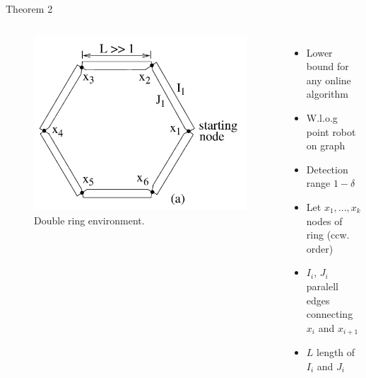 \documentclass{beamer}
\begin{document}
\begin{frame}{Theorem 2}
    \begin{columns}
        \begin{figure}
            \includegraphics[width=\linewidth]{Images/fig13a.png}
            \caption{Double ring environment.}
        \end{figure}
        \begin{itemize}
            \item Lower bound for any online algorithm
            \item W.l.o.g point robot on graph
            \item Detection range $1 - \delta$
            \item Let $x_1, ..., x_k$ nodes of ring (ccw. order)
            \item $I_i$, $J_i$ paralell edges connecting $x_i$ and $x_{i+1}$
            \item $L$ length of $I_i$ and $J_i$
        \end{itemize}
    \end{columns}
\end{frame}
\end{document}
